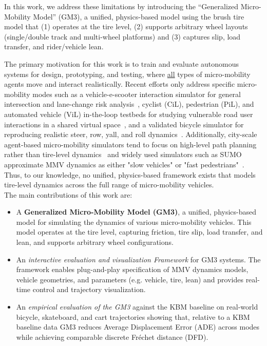 \documentclass[letterpaper, 10 pt, conference]{ieeeconf}  %
\begin{document}
In this work, we address these limitations by introducing the ``Generalized Micro-Mobility Model'' (GM3), a unified, physics-based model using the brush tire model that (1) operates at the tire level, (2) supports arbitrary wheel layouts (single/double track and multi-wheel platforms) and (3) captures slip, load transfer, and rider/vehicle lean. 

The primary motivation for this work is to train and evaluate autonomous systems for design, prototyping, and testing, where \underline{all} types of micro-mobility agents move and interact realistically. Recent efforts only address specific micro-mobility modes such as a vehicle-e-scooter interaction simulator for general intersection and lane-change risk analysis~\cite{simFWVEInteraction2023}, cyclist (CiL), pedestrian (PiL), and automated vehicle (ViL) in-the-loop testbeds for studying vulnerable road user interactions in a shared virtual space~\cite{kaiserUrbanInteraction2024}, and a validated bicycle simulator for reproducing realistic steer, row, yall, and roll dynamics~\cite{haasnoot2024validation}. Additionally, city-scale agent-based micro-mobility simulators tend to focus on high-level path planning rather than tire-level dynamics~\cite{panagiotis2024MMVsim} and widely used simulators such as SUMO approximate MMV dynamics as either "slow vehicles" or "fast pedestrians"~\cite{roosta2023state}. Thus, to our knowledge, no unified, physics-based framework exists that models tire-level dynamics across the full range of micro-mobility vehicles. \\

The main contributions of this work are:
\begin{itemize}
    \item A {\bf Generalized Micro-Mobility Model (GM3)}, a unified, physics-based model for simulating the dynamics of various micro-mobility vehicles. This model operates at the tire level, capturing friction, tire slip, load transfer, and lean, and supports arbitrary wheel configurations.
    \item An {\em interactive evaluation and visualization Framework} for GM3 systems. The framework enables plug-and-play specification of MMV dynamics models, vehicle geometries, and parameters (e.g. vehicle, tire, lean) and provides real-time control and trajectory visualization.
    \item An {\em empirical evaluation of the GM3} against the KBM baseline on real-world bicycle, skateboard, and cart trajectories showing that, relative to a KBM baseline data GM3 reduces Average Displacement Error (ADE) across modes while achieving comparable discrete Fréchet distance (DFD).
\end{itemize}
\end{document}
